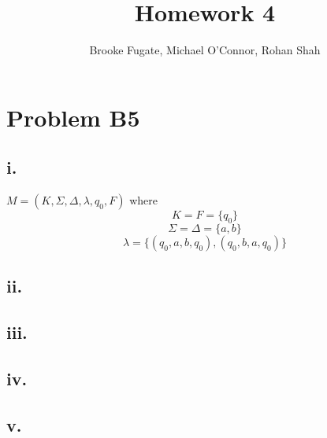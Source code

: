 \documentclass[12pt]{article}
\begin{document}
\pagestyle{plain}
\titleformat{\subsection}[runin]
  {\normalfont\large\bfseries}{\thesubsection}{1em}{}

\title{Homework 4}
\author{Brooke Fugate, Michael O'Connor, Rohan Shah}
\date{}

\maketitle

\section*{Problem B5}
\subsection*{i.}
$M = (K, \Sigma, \Delta, \lambda, q_0, F)$ where
$$K = F = \{q_0\}$$
$$\Sigma = \Delta = \{a,b\}$$
$$\lambda = \{(q_0, a, b, q_0), (q_0, b, a, q_0)\}$$
\subsection*{ii.}

\subsection*{iii.}

\subsection*{iv.}

\subsection*{v.}
\end{document}
